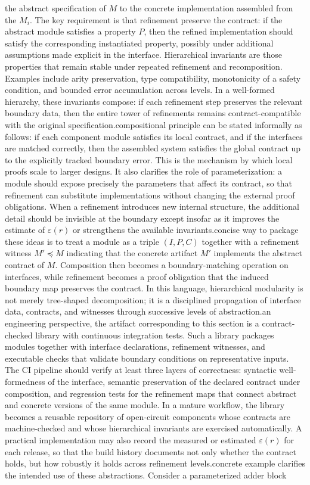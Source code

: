 the abstract specification of \(M\) to the concrete implementation assembled from the \(M_i\). The key requirement is that refinement preserve the contract: if the abstract module satisfies a property \(P\), then the refined implementation should satisfy the corresponding instantiated property, possibly under additional assumptions made explicit in the interface. Hierarchical invariants are those properties that remain stable under repeated refinement and recomposition. Examples include arity preservation, type compatibility, monotonicity of a safety condition, and bounded error accumulation across levels. In a well-formed hierarchy, these invariants compose: if each refinement step preserves the relevant boundary data, then the entire tower of refinements remains contract-compatible with the original specification.\n\nThe compositional principle can be stated informally as follows: if each component module satisfies its local contract, and if the interfaces are matched correctly, then the assembled system satisfies the global contract up to the explicitly tracked boundary error. This is the mechanism by which local proofs scale to larger designs. It also clarifies the role of parameterization: a module should expose precisely the parameters that affect its contract, so that refinement can substitute implementations without changing the external proof obligations. When a refinement introduces new internal structure, the additional detail should be invisible at the boundary except insofar as it improves the estimate of \(\varepsilon(r)\) or strengthens the available invariants.\n\nA concise way to package these ideas is to treat a module as a triple \((I,P,C)\) together with a refinement witness \(M' \preceq M\) indicating that the concrete artifact \(M'\) implements the abstract contract of \(M\). Composition then becomes a boundary-matching operation on interfaces, while refinement becomes a proof obligation that the induced boundary map preserves the contract. In this language, hierarchical modularity is not merely tree-shaped decomposition; it is a disciplined propagation of interface data, contracts, and witnesses through successive levels of abstraction.\n\nFrom an engineering perspective, the artifact corresponding to this section is a contract-checked library with continuous integration tests. Such a library packages modules together with interface declarations, refinement witnesses, and executable checks that validate boundary conditions on representative inputs. The CI pipeline should verify at least three layers of correctness: syntactic well-formedness of the interface, semantic preservation of the declared contract under composition, and regression tests for the refinement maps that connect abstract and concrete versions of the same module. In a mature workflow, the library becomes a reusable repository of open-circuit components whose contracts are machine-checked and whose hierarchical invariants are exercised automatically. A practical implementation may also record the measured or estimated \(\varepsilon(r)\) for each release, so that the build history documents not only whether the contract holds, but how robustly it holds across refinement levels.\n\nA concrete example clarifies the intended use of these abstractions. Consider a parameterized adder block 